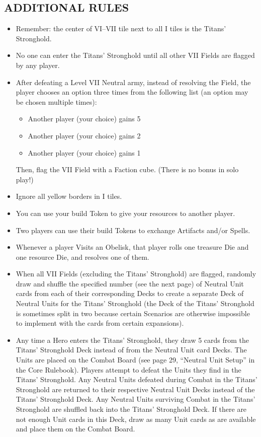 \begin{multicols*}{2}
\subsection*{\MakeUppercase{Additional Rules}}
\begin{itemize}
  \item Remember: the center of VI--VII tile next to all I tiles is the Titans' Stronghold.
  \item No one can enter the Titans' Stronghold until all other VII Fields are flagged by any player.
  \item After defeating a Level VII Neutral army, instead of resolving the Field, the player chooses an option three times from the following list (an option may be chosen multiple times):
    \begin{itemize}
      \item Another player (your choice) gains 5\,
      \item Another player (your choice) gains 2\,
      \item Another player (your choice) gains 1\,
    \end{itemize}
  Then, flag the VII Field with a Faction cube.
  (There is no bonus in solo play!)
  \item Ignore all yellow borders in I tiles.
  \item You can use your build Token to give your resources to another player.
  \item Two players can use their build Tokens to exchange Artifacts and/or Spells.
  \item Whenever a player Visits an Obelisk, that player rolls one treasure Die and one resource Die, and resolves one of them.
  \item When all VII Fields (excluding the Titans' Stronghold) are flagged, randomly draw and shuffle the specified number (see the next page) of Neutral Unit cards from each of their corresponding Decks to create a separate Deck of Neutral Units for the Titans' Stronghold (the Deck of the Titans' Stronghold is sometimes split in two because certain Scenarios are otherwise impossible to implement with the cards from certain expansions).
  \item Any time a Hero enters the Titans' Stronghold, they draw 5 cards from the Titans' Stronghold Deck instead of from the Neutral Unit card Decks. The Units are placed on the Combat Board (see page 29, ``Neutral Unit Setup'' in the Core Rulebook). Players attempt to defeat the Units they find in the Titans' Stronghold. Any Neutral Units defeated during Combat in the Titans' Stronghold are returned to their respective Neutral Unit Decks instead of the Titans' Stronghold Deck. Any Neutral Units surviving Combat in the Titans' Stronghold are shuffled back into the Titans' Stronghold Deck. If there are not enough Unit cards in this Deck, draw as many Unit cards as are available and place them on the Combat Board.

\end{itemize}
\end{multicols*}

